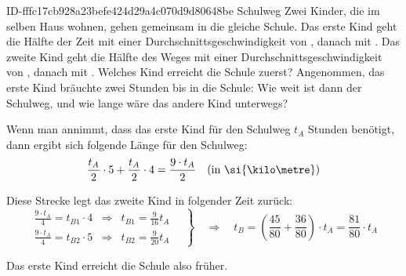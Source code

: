 \begin{exercise}
      {ID-fffc17cb928a23befe424d29a4c070d9d80648be}
      {Schulweg}
  \ifproblem\problem
    Zwei Kinder, die im selben Haus wohnen, gehen gemeinsam in die gleiche
    Schule. Das erste Kind geht die Hälfte der Zeit mit einer
    Durchschnittsgeschwindigkeit von , danach mit . Das
    zweite Kind geht die Hälfte des Weges mit einer Durchschnittsgeschwindigkeit
    von , danach mit . Welches Kind erreicht die Schule
    zuerst?
  \fi
  \ifoutline\outline
    Angenommen, das erste Kind bräuchte zwei Stunden bis in die Schule:
    Wie weit ist dann der Schulweg, und wie lange wäre das andere Kind unterwegs?
  \fi
  \ifoutcome\outcome
    \begin{center}
    \end{center}
    Wenn man annimmt, dass das erste Kind für den Schulweg $t_{A}$ Stunden benötigt,
    dann ergibt sich folgende Länge für den Schulweg:
    \begin{equation*}
      \frac{t_{A}}{2}\cdot5+\frac{t_{A}}{2}\cdot4
      =
      \frac{9\cdot t_{A}}{2}
      \quad\text{(in \si{\kilo\metre})}
    \end{equation*}

    Diese Strecke legt das zweite Kind in folgender Zeit zurück:
    \begin{equation*}
      \left.
      \begin{array}{lcl}
        \displaystyle\frac{9\cdot t_{A}}{4}=t_{B1}\cdot4 & \Rightarrow & t_{B1}=\displaystyle\frac{9}{16}t_{A}\\[3ex]
        \displaystyle\frac{9\cdot t_{A}}{4}=t_{B2}\cdot5 & \Rightarrow & t_{B2}=\displaystyle\frac{9}{20}t_{A}
      \end{array}
      \quad\right\}
      \quad\Rightarrow\quad
      t_{B}=\left(\frac{45}{80}+\frac{36}{80}\right)\cdot t_{A}=\frac{81}{80}\cdot t_{A}
    \end{equation*}

    Das erste Kind erreicht die Schule also früher.
  \fi
\end{exercise}
